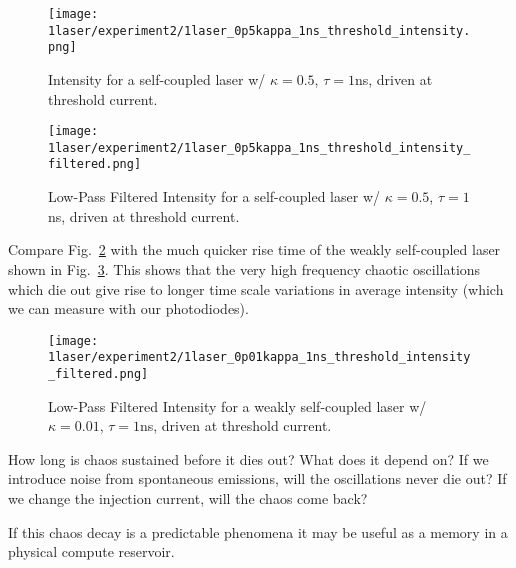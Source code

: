 \documentclass[11pt,letterpaper]{article}
\begin{document}
\begin{figure}[H]
\centering
\texttt{[image: 1laser/experiment2/1laser\_0p5kappa\_1ns\_threshold\_intensity.png]}
\caption{Intensity for a self-coupled laser w/ $\kappa = 0.5$, $\tau = 1$ns, driven at threshold current.\label{chaoticoscdied}}
\end{figure}

\begin{figure}[H]
\centering
\texttt{[image: 1laser/experiment2/1laser\_0p5kappa\_1ns\_threshold\_intensity\_filtered.png]}
\caption{Low-Pass Filtered Intensity for a self-coupled laser w/ $\kappa = 0.5$, $\tau = 1$ns, driven at threshold current.\label{chaoticoscdiedfiltered}}
\end{figure}

Compare Fig.~\ref{chaoticoscdiedfiltered} with the much quicker rise time of the weakly self-coupled laser shown in Fig.~\ref{weakselfcouple}. This shows that the very high frequency chaotic oscillations which die out give rise to longer time scale variations in average intensity (which we can measure with our photodiodes).

\begin{figure}[H]
\centering
\texttt{[image: 1laser/experiment2/1laser\_0p01kappa\_1ns\_threshold\_intensity\_filtered.png]}
\caption{Low-Pass Filtered Intensity for a weakly self-coupled laser w/ $\kappa = 0.01$, $\tau = 1$ns, driven at threshold current.\label{weakselfcouple}}
\end{figure}

How long is chaos sustained before it dies out? What does it depend on? If we introduce noise from spontaneous emissions, will the oscillations never die out? If we change the injection current, will the chaos come back?

If this chaos decay is a predictable phenomena it may be useful as a memory in a physical compute reservoir.
\end{document}
